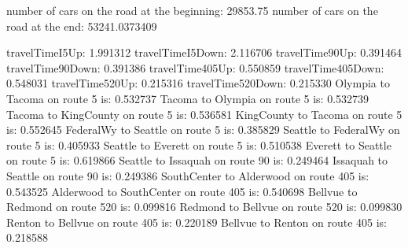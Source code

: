 number of cars on the road at the beginning:
29853.75
number of cars on the road at the end:
53241.0373409

travelTimeI5Up: 1.991312
travelTimeI5Down: 2.116706
travelTime90Up: 0.391464
travelTime90Down: 0.391386
travelTime405Up: 0.550859
travelTime405Down: 0.548031
travelTime520Up: 0.215316
travelTime520Down: 0.215330
Olympia to Tacoma on route 5 is: 0.532737
Tacoma to Olympia on route 5 is: 0.532739
Tacoma to KingCounty on route 5 is: 0.536581
KingCounty to Tacoma on route 5 is: 0.552645
FederalWy to Seattle on route 5 is: 0.385829
Seattle to FederalWy on route 5 is: 0.405933
Seattle to Everett on route 5 is: 0.510538
Everett to Seattle on route 5 is: 0.619866
Seattle to Issaquah on route 90 is: 0.249464
Issaquah to Seattle on route 90 is: 0.249386
SouthCenter to Alderwood on route 405 is: 0.543525
Alderwood to SouthCenter on route 405 is: 0.540698
Bellvue to Redmond on route 520 is: 0.099816
Redmond to Bellvue on route 520 is: 0.099830
Renton to Bellvue on route 405 is: 0.220189
Bellvue to Renton on route 405 is: 0.218588